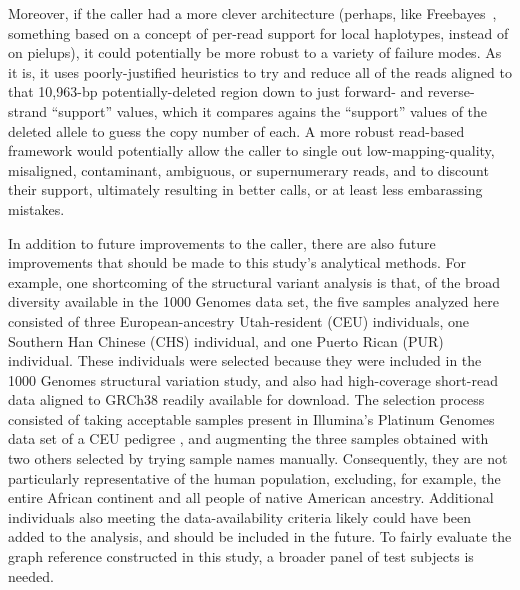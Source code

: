 Moreover, if the caller had a more clever architecture (perhaps, like Freebayes~\cite{garrison2012haplotype}, something based on a concept of per-read support for local haplotypes, instead of on pielups), it could potentially be more robust to a variety of failure modes. As it is, it uses poorly-justified heuristics to try and reduce all of the reads aligned to that 10,963-bp potentially-deleted region down to just forward- and reverse-strand ``support'' values, which it compares agains the ``support'' values of the deleted allele to guess the copy number of each. A more robust read-based framework would potentially allow the caller to single out low-mapping-quality, misaligned, contaminant, ambiguous, or supernumerary reads, and to discount their support, ultimately resulting in better calls, or at least less embarassing mistakes.

In addition to future improvements to the caller, there are also future improvements that should be made to this study's analytical methods. For example, one shortcoming of the structural variant analysis is that, of the broad diversity available in the 1000 Genomes data set, the five samples analyzed here consisted of three European-ancestry Utah-resident (CEU) individuals, one Southern Han Chinese (CHS) individual, and one Puerto Rican (PUR) individual. These individuals were selected because they were included in the 1000 Genomes structural variation study, and also had high-coverage short-read data aligned to GRCh38 readily available for download. The selection process consisted of taking acceptable samples present in Illumina's Platinum Genomes data set of a CEU pedigree \cite{eberle2013platinum}, and augmenting the three samples obtained with two others selected by trying sample names manually. Consequently, they are not particularly representative of the human population, excluding, for example, the entire African continent and all people of native American ancestry. Additional individuals also meeting the data-availability criteria likely could have been added to the analysis, and should be included in the future. To fairly evaluate the graph reference constructed in this study, a broader panel of test subjects is needed.

